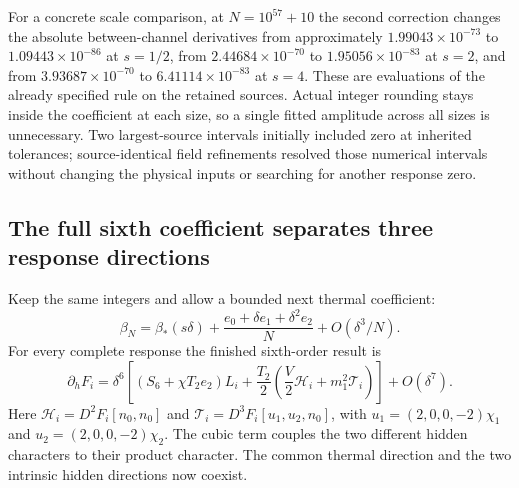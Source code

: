 For a concrete scale comparison, at $N=10^{57}+10$ the second correction changes the absolute between-channel derivatives from approximately $1.99043\times10^{-73}$ to $1.09443\times10^{-86}$ at $s=1/2$, from $2.44684\times10^{-70}$ to $1.95056\times10^{-83}$ at $s=2$, and from $3.93687\times10^{-70}$ to $6.41114\times10^{-83}$ at $s=4$. These are evaluations of the already specified rule on the retained sources. Actual integer rounding stays inside the coefficient at each size, so a single fitted amplitude across all sizes is unnecessary. Two largest-source intervals initially included zero at inherited tolerances; source-identical field refinements resolved those numerical intervals without changing the physical inputs or searching for another response zero.

\subsection{The full sixth coefficient separates three response directions}

Keep the same integers and allow a bounded next thermal coefficient:
\begin{equation}
 \beta_N=\beta_*(s\delta)
 +\frac{e_0+\delta e_1+\delta^2e_2}{N}
 +O(\delta^3/N).
\end{equation}
For every complete response the finished sixth-order result is
\begin{equation}
 \partial_hF_i=\delta^6\left[
 (S_6+\chi T_2e_2)L_i
 +\frac{T_2}{2}\left(\frac V2\mathcal H_i+m_1^2\mathcal T_i\right)
 \right]+O(\delta^7).
\end{equation}
Here $\mathcal H_i=D^2F_i[n_0,n_0]$ and
$\mathcal T_i=D^3F_i[u_1,u_2,n_0]$, with
$u_1=(2,0,0,-2)\chi_1$ and $u_2=(2,0,0,-2)\chi_2$. The cubic term couples the two different hidden characters to their product character. The common thermal direction and the two intrinsic hidden directions now coexist.

